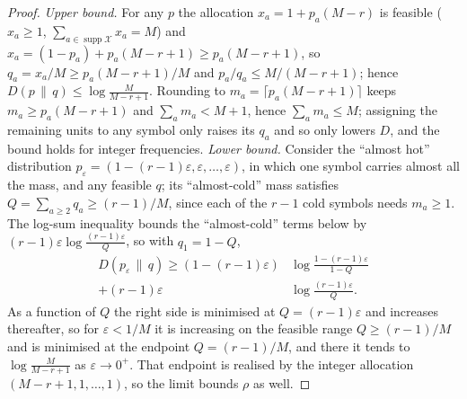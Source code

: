 \documentclass[10pt,a4paper]{amsart}
\DeclareMathOperator{\supp}{supp}
\begin{document}
\begin{proof}
\emph{Upper bound.} For any $p$ the allocation $x_a=1+p_a(M-r)$ is feasible
($x_a\ge1$, $\sum_{a\in \supp \mathcal X}x_a=M$) and
$x_a=(1-p_a)+p_a(M-r+1)\ge p_a(M-r+1)$, so $q_a=x_a/M\ge p_a(M-r+1)/M$ and
$p_a/q_a\le M/(M-r+1)$; hence $D(p\,\|\,q)\le\log\frac{M}{M-r+1}$. Rounding
to $m_a=\lceil p_a(M-r+1)\rceil$ keeps $m_a\ge p_a(M-r+1)$ and
$\sum_a m_a<M+1$, hence $\sum_a m_a\le M$; assigning the remaining units to any
symbol only raises its $q_a$ and so only lowers $D$, and the bound holds for
integer frequencies.
\emph{Lower bound.} Consider the ``almost hot'' distribution
$p_\varepsilon=(1-(r-1)\varepsilon,\varepsilon,\dots,\varepsilon)$, in which one
symbol carries almost all the mass, and any feasible $q$; its ``almost-cold''
mass satisfies $Q=\sum_{a\ge2}q_a\ge(r-1)/M$, since each of the $r-1$ cold
symbols needs $m_a\ge1$. The log-sum
inequality bounds the ``almost-cold'' terms below by
$(r-1)\varepsilon\log\frac{(r-1)\varepsilon}{Q}$, so with $q_1=1-Q$,
\begin{equation}
\begin{aligned}
   D(p_\varepsilon\,\|\,q)\ge
   (1-(r-1)\varepsilon)&\log\frac{1-(r-1)\varepsilon}{1-Q}\\
   +(r-1)\varepsilon&\log\frac{(r-1)\varepsilon}{Q}.
\end{aligned}
\end{equation}
As a function of $Q$ the right side is minimised at $Q=(r-1)\varepsilon$ and
increases thereafter, so for $\varepsilon<1/M$ it is increasing on the feasible
range $Q\ge(r-1)/M$ and is minimised at the endpoint $Q=(r-1)/M$, and there it tends
to $\log\frac{M}{M-r+1}$ as $\varepsilon\to0^+$. That endpoint is realised by the
integer allocation $(M-r+1,1,\dots,1)$, so the limit bounds $\rho$ as well.
\end{proof}
\end{document}
